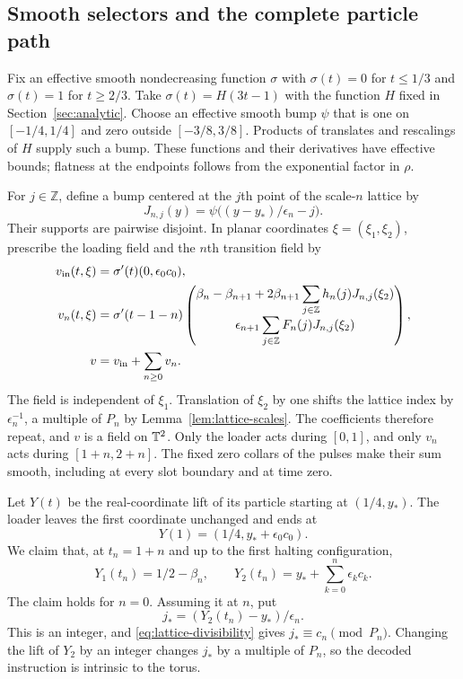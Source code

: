 \subsection{Smooth selectors and the complete particle path}

Fix an effective smooth nondecreasing function $\sigma$ with
$\sigma(t)=0$ for $t\le1/3$ and $\sigma(t)=1$ for $t\ge2/3$.
Take $\sigma(t)=H(3t-1)$ with the function $H$ fixed in
Section~\ref{sec:analytic}.
Choose an effective smooth bump $\psi$ that is one on $[-1/4,1/4]$
and zero outside $[-3/8,3/8]$.  Products of translates and rescalings
of $H$ supply such a bump.  These functions and their derivatives have
effective bounds; flatness at the endpoints follows from the
exponential factor in $\rho$.

For $j\in\mathbb Z$, define a bump centered at the $j$th point of
the scale-$n$ lattice by
\[
 J_{n,j}(y)=\psi\bigl((y-y_*)/\epsilon_n-j\bigr).
\]
Their supports are pairwise disjoint.  In planar coordinates
$\xi=(\xi_1,\xi_2)$, prescribe the loading field and the $n$th
transition field by
\begin{align}
 v_{\rm in}(t,\xi)&=\sigma'(t)(0,\epsilon_0c_0),
 \label{eq:lattice-loader}\\
 v_n(t,\xi)&=\sigma'(t-1-n)
 \begin{pmatrix}
  \beta_n-\beta_{n+1}
     +2\beta_{n+1}\displaystyle\sum_{j\in\mathbb Z}h_n(j)J_{n,j}(\xi_2)\\
  \epsilon_{n+1}\displaystyle\sum_{j\in\mathbb Z}F_n(j)J_{n,j}(\xi_2)
 \end{pmatrix},
 \label{eq:lattice-slot}\\
 v&=v_{\rm in}+\sum_{n\ge0}v_n.
 \label{eq:lattice-planar-field}
\end{align}
The field is independent of $\xi_1$.  Translation of $\xi_2$ by
one shifts the lattice index by $\epsilon_n^{-1}$, a multiple of
$P_n$ by Lemma~\ref{lem:lattice-scales}.  The coefficients therefore
repeat, and $v$ is a field on $\mathbb T^2$.  Only the loader acts during
$[0,1]$, and only $v_n$ acts during $[1+n,2+n]$.  The fixed zero
collars of the pulses make their sum smooth, including at every slot
boundary and at time zero.

Let $Y(t)$ be the real-coordinate lift of its particle starting at
$(1/4,y_*)$.  The loader leaves the first coordinate unchanged and
ends at
\[
 Y(1)=(1/4,y_*+\epsilon_0c_0).
\]
We claim that, at $t_n=1+n$ and up to the first halting configuration,
\begin{equation}\label{eq:lattice-history}
 Y_1(t_n)=1/2-\beta_n,\qquad
 Y_2(t_n)=y_*+\sum_{k=0}^n\epsilon_kc_k.
\end{equation}
The claim holds for $n=0$.  Assuming it at $n$, put
\[
 j_*=(Y_2(t_n)-y_*)/\epsilon_n.
\]
This is an integer, and \eqref{eq:lattice-divisibility} gives
$j_*\equiv c_n\pmod {P_n}$.  Changing the lift of $Y_2$ by an
integer changes $j_*$ by a multiple of $P_n$, so the decoded instruction
is intrinsic to the torus.

